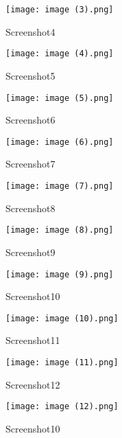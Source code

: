 \documentclass{article}
\begin{document}
\begin{figure}

\centering
    \texttt{[image: image (3).png]}
    \caption{Screenshot4}

\centering
    \texttt{[image: image (4).png]}
    \caption{Screenshot5}

\centering
    \texttt{[image: image (5).png]}
    \caption{Screenshot6}

    \label{fig:example}

\end{figure}

\begin{figure}

\centering
    \texttt{[image: image (6).png]}
    \caption{Screenshot7}

\centering
    \texttt{[image: image (7).png]}
    \caption{Screenshot8}

\centering
    \texttt{[image: image (8).png]}
    \caption{Screenshot9}

    \label{fig:example}

\end{figure}

\begin{figure}

\centering
    \texttt{[image: image (9).png]}
    \caption{Screenshot10}

\centering
    \texttt{[image: image (10).png]}
    \caption{Screenshot11}

\centering
    \texttt{[image: image (11).png]}
    \caption{Screenshot12}

    \label{fig:example}

\end{figure}

\begin{figure}

\centering
    \texttt{[image: image (12).png]}
    \caption{Screenshot10}

    \label{fig:example}

\end{figure}
\end{document}
